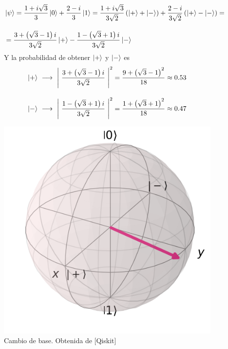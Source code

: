 \documentclass{article}
\numberwithin{equation}{section} %
\begin{document}
    \begin{figure}[h!]
        \centering
        \begin{minipage}{0.65\textwidth}
            \begin{align*}
                &\ket{\psi} = \frac{1 + i \sqrt{3}}{3} \ket{0} + \frac{2 - i}{3} \ket{1} = \frac{1 + i \sqrt{3}}{3 \sqrt{2}} \left( \ket{+} + \ket{-} \right) + \frac{2 - i}{3 \sqrt{2}} \left( \ket{+} - \ket{-} \right) = \\[10pt]
                &= \frac{3 + \left( \sqrt{3} - 1 \right) i}{3 \sqrt{2}} \ket{+} - \frac{1 - \left( \sqrt{3} + 1 \right) i}{3 \sqrt{2}} \ket{-}
            \end{align*}
            Y la probabilidad de obtener \( \ket{+} \) y \( \ket{-} \) es 
            \begin{align*}
                \ket{+} \ &\longrightarrow \ \left| \ \frac{3 + \left( \sqrt{3} - 1 \right) i}{3 \sqrt{2}} \ \right| ^ {2} = \frac{9 + \left( \sqrt{3} - 1\right) ^ {2}}{18} \approx 0.53 \\[10pt]
                \ket{-} \ &\longrightarrow \ \left| \ \frac{1 - \left( \sqrt{3} + 1 \right) i}{3 \sqrt{2}} \ \right| ^ {2} = \frac{1 + \left( \sqrt{3} + 1\right) ^ {2}}{18} \approx 0.47
            \end{align*}
        \end{minipage}
        \hfill
        \begin{minipage}{0.3\textwidth}
            \includegraphics[width=\textwidth]{img/Bloch/bloch_change_basis_example.png}  
        \end{minipage}
        \caption{Cambio de base. Obtenida de [Qiskit]}\label{fig: bloch_ejemplo_medicion_2} 
    \end{figure}
\end{document}
